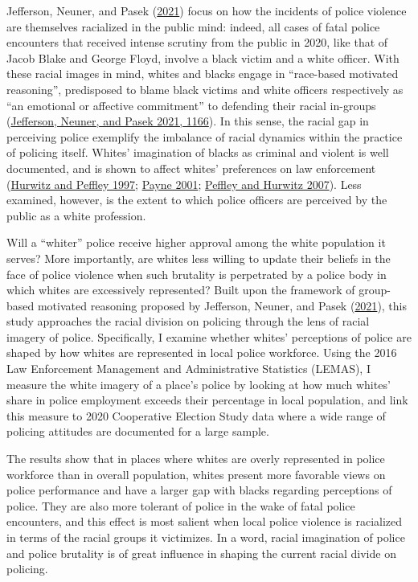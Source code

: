 \documentclass[
  12pt,
]{article}
\begin{document}
Jefferson, Neuner, and Pasek
(\protect\hyperlink{ref-jefferson2021}{2021}) focus on how the incidents
of police violence are themselves racialized in the public mind: indeed,
all cases of fatal police encounters that received intense scrutiny from
the public in 2020, like that of Jacob Blake and George Floyd, involve a
black victim and a white officer. With these racial images in mind,
whites and blacks engage in ``race-based motivated reasoning'',
predisposed to blame black victims and white officers respectively as
``an emotional or affective commitment'' to defending their racial
in-groups (\protect\hyperlink{ref-jefferson2021}{Jefferson, Neuner, and
Pasek 2021, 1166}). In this sense, the racial gap in perceiving police
exemplify the imbalance of racial dynamics within the practice of
policing itself. Whites' imagination of blacks as criminal and violent
is well documented, and is shown to affect whites' preferences on law
enforcement (\protect\hyperlink{ref-hurwitz1997}{Hurwitz and Peffley
1997}; \protect\hyperlink{ref-payne2001}{Payne 2001};
\protect\hyperlink{ref-peffley2007}{Peffley and Hurwitz 2007}). Less
examined, however, is the extent to which police officers are perceived
by the public as a white profession.

Will a ``whiter'' police receive higher approval among the white
population it serves? More importantly, are whites less willing to
update their beliefs in the face of police violence when such brutality
is perpetrated by a police body in which whites are excessively
represented? Built upon the framework of group-based motivated reasoning
proposed by Jefferson, Neuner, and Pasek
(\protect\hyperlink{ref-jefferson2021}{2021}), this study approaches the
racial division on policing through the lens of racial imagery of
police. Specifically, I examine whether whites' perceptions of police
are shaped by how whites are represented in local police workforce.
Using the 2016 Law Enforcement Management and Administrative Statistics
(LEMAS), I measure the white imagery of a place's police by looking at
how much whites' share in police employment exceeds their percentage in
local population, and link this measure to 2020 Cooperative Election
Study data where a wide range of policing attitudes are documented for a
large sample.

The results show that in places where whites are overly represented in
police workforce than in overall population, whites present more
favorable views on police performance and have a larger gap with blacks
regarding perceptions of police. They are also more tolerant of police
in the wake of fatal police encounters, and this effect is most salient
when local police violence is racialized in terms of the racial groups
it victimizes. In a word, racial imagination of police and police
brutality is of great influence in shaping the current racial divide on
policing.
\end{document}
